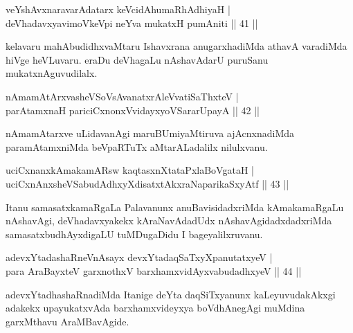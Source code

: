 \centerline{}


\begin{shl}
veYshAvxnaravarAdatarx keVcidAhumaRhAdhiyaH |\\
deVhadavxyavimoVkeV\s pi neYva mukatxH pumAniti \hfill || 41 ||
\end{shl}


\begin{artha}
kelavaru mahAbudidhxvaMtaru Ishavxrana anugarxhadiMda athavA varadiMda hiVge heVLuvaru. eraDu deVhagaLu nAshavAdarU puruSanu mukatxnAguvudilalx.
\end{artha}


\begin{shl}
nAmamAtArxvasheVSoV\s sAvanatxrAleV\s vatiSaThxteV |\\
parAtamxnaH pariciCxnonxV\s vidayxyoVSararUpayA \hfill || 42 ||
\end{shl}

\begin{artha}
nAmamAtarxve uLidavanAgi maruBUmiyaMtiruva ajAcnxnadiMda paramAtamxniMda beVpaRTuTx 
aMtarALadalilx nilulxvanu.
\end{artha}

\begin{shl}
uciCxnanxkAmakamAR\s sw kaqtasxnXtataPxlaBoVgataH |\\
uciCxnAnxsheVSabudAdhxyXdisatxtAkxraNaparikaSxyAtf \hfill || 43 ||
\end{shl}

\begin{artha}
Itanu samasatxkamaRgaLa Palavanunx anuBavisidadxriMda kAmakamaRgaLu nAshavAgi, deVhadavxyakekx kAraNavAdadUdx nAshavAgidadxdadxriMda samasatxbudhAyxdigaLU tuMDugaDidu  I bageyalilxruvanu.
\end{artha}

\begin{shl}
adevxYtadashaRneVnAsayx devxYtadaqSaTxyXpanutatxyeV |\\
para AraBayxteV garxnothxV barxhamxvidAyxvabudadhxyeV \hfill || 44 ||
\end{shl}

\begin{artha}
adevxYtadhashaRnadiMda Itanige deYta daqSiTxyanunx kaLeyuvudakAkxgi adakekx upayukatxvAda barxhamxvideyxya boVdhAnegAgi muMdina garxMthavu AraMBavAgide.
\end{artha}

